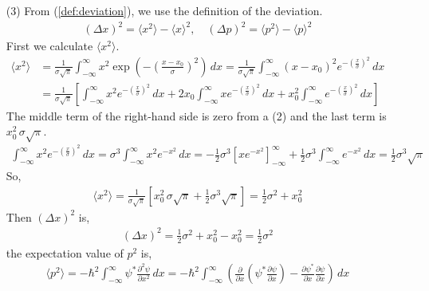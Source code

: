 \documentclass[floatfix,nofootinbib,superscriptaddress,fleqn]{revtex4}
\begin{document}
\begin{itemize}
\item[(3)] From (\ref{def:deviation}), we use the definition of the deviation.
  \begin{align}
    {(\Delta x)}^2 = \langle x^2\rangle - \langle x\rangle^2 ,\quad {(\Delta p)}^2 
    = \langle p^2\rangle - \langle p\rangle^2 
  \end{align}
First we calculate $\langle x^2\rangle$.
  \begin{align}
    \langle x^2\rangle 
    &= \frac{1}{\sigma\sqrt{\pi}}\int_{-\infty}^{\infty} x^2 
    \exp\left(-{\left( \frac{x-x_0}{\sigma}\right)}^2\right)\,dx 
    = \frac{1}{\sigma\sqrt{\pi}}\int_{-\infty}^{\infty}(x-x_0)^2 
    e^{-{\left( \frac{x}{\sigma}\right)}^2}\,dx 
    \\
    &= \frac{1}{\sigma\sqrt{\pi}}\left[\int_{-\infty}^{\infty} x^2 
    e^{-{\left( \frac{x}{\sigma} \right)}^2}\,dx
    +2x_0\int_{-\infty}^{\infty}xe^{-{\left(
    \frac{x}{\sigma}\right)}^2}\,dx
    +x^2_0\int_{-\infty}^{\infty}e^{-{\left(
    \frac{x}{\sigma}\right)}^2}\,dx\right]
  \end{align}
The middle term of the right-hand side is zero from a (2) 
and the last term is $x^2_0\,\sigma\sqrt{\pi}$.
  \begin{align}
    \int_{-\infty}^{\infty} x^2 e^{-{\left(
      \frac{x}{\sigma}\right)}^2}\,dx 
    =\sigma^3\int_{-\infty}^{\infty} x^2e^{-x^2}\,dx 
    =-\frac{1}{2}\sigma^3{\left[xe^{-x^2}\right]}^{\infty}_{-\infty}
    +\frac{1}{2}\sigma^3\int_{-\infty}^{\infty} 
    e^{-x^2}\,dx
    =\frac{1}{2}\sigma^3\sqrt{\pi}
  \end{align}
So,
  \begin{align}
    \langle x^2 \rangle = \frac{1}{\sigma\sqrt{\pi}}
    \left[x^2_0\,\sigma\sqrt{\pi}
    +\frac{1}{2}\sigma^3\sqrt{\pi}\right]
   =\frac{1}{2}\sigma^2+x_0^2
  \end{align}
Then $\left(\Delta x\right)^2$ is,
  \begin{align}
    \left(\Delta x\right)^2 = \frac{1}{2}\sigma^2+x_0^2 
    - x_0^2 = \frac{1}{2}\sigma^2
  \end{align}
the expectation value of $p^2$ is,
  \begin{align}
    \langle p^2 \rangle = -\hbar^2 \int_{-\infty}^{\infty} \psi^* 
    \frac{\partial^2 \psi}{\partial x^2}\,dx 
    = -\hbar^2\int_{-\infty}^{\infty} \left(\frac{\partial}{\partial x} 
    \left(\psi^*\frac{\partial \psi}{\partial x}\right) 
    -\frac{\partial \psi^*}{\partial x}
    \frac{\partial\psi}{\partial x}\right)\,dx
  \end{align}

\end{itemize}
\end{document}
